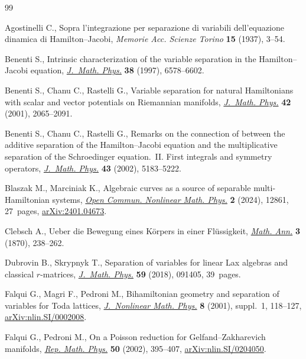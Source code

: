 \begin{thebibliography}{99}
\footnotesize\itemsep=0pt

Agostinelli C., Sopra l'integrazione per separazione di variabili
 dell'equazione dinamica di {H}amilton--{J}acobi, \textit{Memorie Acc. Scienze
 Torino} \textbf{15} (1937), 3--54.

Benenti S., Intrinsic characterization of the variable separation in the
 {H}amilton--{J}acobi equation,
 \href{https://doi.org/10.1063/1.532226}{\textit{J.~Math. Phys.}} \textbf{38}
 (1997), 6578--6602.

Benenti S., Chanu C., Rastelli G., Variable separation for natural
 {H}amiltonians with scalar and vector potentials on {R}iemannian manifolds,
 \href{https://doi.org/10.1063/1.1340868}{\textit{J.~Math. Phys.}} \textbf{42}
 (2001), 2065--2091.

Benenti S., Chanu C., Rastelli G., Remarks on the connection of between the
 additive separation of the {H}amilton--{J}acobi equation and the
 multiplicative separation of the Schroedinger equation.~{II}. First integrals
 and symmetry operators,
 \href{https://doi.org/10.1063/1.1506181}{\textit{J.~Math. Phys.}} \textbf{43}
 (2002), 5183--5222.

Blaszak M., Marciniak K., Algebraic curves as a source of separable
 multi-{H}amiltonian systems,
 \href{https://doi.org/10.46298/ocnmp.12861}{\textit{Open Commun. Nonlinear
 Math. Phys.}} \textbf{2} (2024), 12861, 27~pages,
 \href{http://arxiv.org/abs/2401.04673}{arXiv:2401.04673}.

Clebsch A., Ueber die {B}ewegung eines {K}\"orpers in einer {F}l\"ussigkeit,
 \href{https://doi.org/10.1007/BF01443985}{\textit{Math. Ann.}} \textbf{3}
 (1870), 238--262.

Dubrovin B., Skrypnyk T., Separation of variables for linear {L}ax algebras and
 classical {$r$}-matrices,
 \href{https://doi.org/10.1063/1.5031769}{\textit{J.~Math. Phys.}} \textbf{59}
 (2018), 091405, 39~pages.

Falqui G., Magri F., Pedroni M., Bihamiltonian geometry and separation of
 variables for {T}oda lattices,
 \href{https://doi.org/10.2991/jnmp.2001.8.s.21}{\textit{J.~Nonlinear Math.
 Phys.}} \textbf{8} (2001), suppl.~1, 118--127,
 \href{http://arxiv.org/abs/nlin.SI/0002008}{arXiv:nlin.SI/0002008}.

Falqui G., Pedroni M., On a {P}oisson reduction for {G}elfand--{Z}akharevich
 manifolds, \href{https://doi.org/10.1016/S0034-4877(02)80068-4}{\textit{Rep.
 Math. Phys.}} \textbf{50} (2002), 395--407,
 \href{http://arxiv.org/abs/nlin.SI/0204050}{arXiv:nlin.SI/0204050}.


\end{thebibliography}
